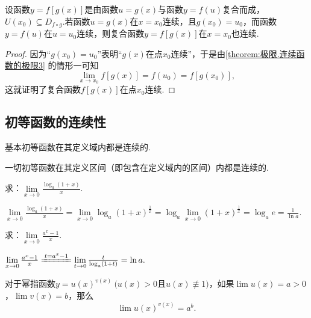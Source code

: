\begin{theorem}\label{theorem:极限.连续函数的极限4}
设函数\(y = f[g(x)]\)是由函数\(u = g(x)\)与函数\(y = f(u)\)复合而成，\(U(x_0) \subseteq D_{f \circ g}\).若函数\(u = g(x)\)在\(x = x_0\)连续，且\(g(x_0) = u_0\)，而函数\(y = f(u)\)在\(u = u_0\)连续，则复合函数\(y = f[g(x)]\)在\(x = x_0\)也连续.
\begin{proof}
因为“\(g(x_0) = u_0\)”表明“\(g(x)\)在点\(x_0\)连续”，于是由\cref{theorem:极限.连续函数的极限3} 的情形一可知\[
\lim\limits_{x \to x_0}f[g(x)]
= f(u_0) = f[g(x_0)],
\]这就证明了复合函数\(f[g(x)]\)在点\(x_0\)连续.
\end{proof}
\end{theorem}

\subsection{初等函数的连续性}
\begin{theorem}\label{theorem:极限.连续函数的极限5}
基本初等函数在其定义域内都是连续的.
\end{theorem}

\begin{corollary}\label{theorem:极限.连续函数的极限6}
一切初等函数在其定义区间（即包含在定义域内的区间）内都是连续的.
\end{corollary}

\begin{example}
求：\(\lim\limits_{x\to0}\frac{\log_a (1+x)}{x}\).
\begin{solution}
\(
\lim\limits_{x\to0}\frac{\log_a (1+x)}{x}
= \lim\limits_{x\to0}\log_a (1+x)^{\frac{1}{x}}
= \log_a \lim\limits_{x\to0}(1+x)^{\frac{1}{x}}
= \log_a e
= \frac{1}{\ln a}.
\)
\end{solution}
\end{example}

\begin{example}
求：\(\lim\limits_{x\to0}\frac{a^x - 1}{x}\).
\begin{solution}
\(
\lim\limits_{x\to0}\frac{a^x - 1}{x}
\xlongequal{t=a^x-1} \lim\limits_{t\to0}\frac{t}{\log_a (1+t)}
= \ln a.
\)
\end{solution}
\end{example}

\begin{theorem}\label{theorem:极限.连续函数的极限7}
对于幂指函数\(y = u(x)^{v(x)}\ (u(x) > 0\)且\(u(x) \not\equiv 1)\)，如果\(\lim u(x) = a > 0\)，\(\lim v(x) = b\)，那么\[
\lim u(x)^{v(x)} = a^b.
\]
\end{theorem}

